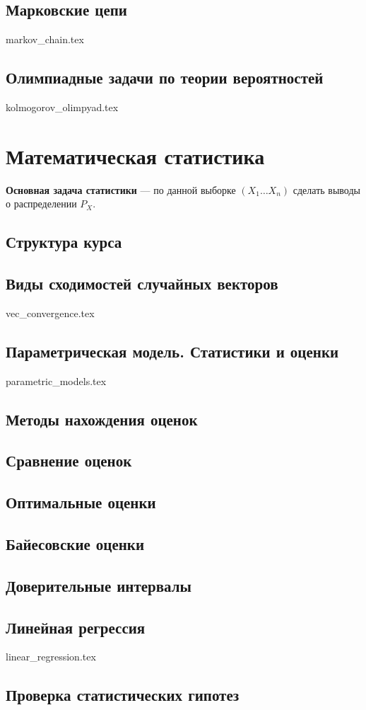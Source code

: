 \documentclass{book}
\theoremstyle{mydef}
\theoremstyle{myth}
\begin{document}
\section{Марковские цепи}

{markov_chain.tex}

\section{Олимпиадные задачи по теории вероятностей}

{kolmogorov_olimpyad.tex}

\chapter{Математическая статистика}

\textbf{Основная задача статистики} --- по данной выборке $(X_1\ldots X_n)$ сделать выводы о распределении $P_X$.

\section{Структура курса}

\section{Виды сходимостей случайных векторов}

{vec_convergence.tex}

\section{Параметрическая модель. Статистики и оценки}

{parametric_models.tex}

\section{Методы нахождения оценок}

\section{Сравнение оценок}

\section{Оптимальные оценки}

\section{Байесовские оценки}

\section{Доверительные интервалы}

\section{Линейная регрессия}

{linear_regression.tex}

\section{Проверка статистических гипотез}
\end{document}
